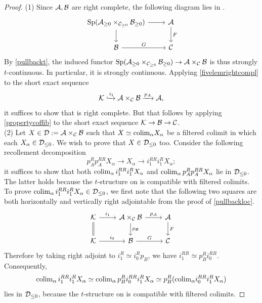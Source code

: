 \documentclass[a4paper,10pt, oneside]{amsart}
\begin{document}
	\begin{proof}
(1) Since $\mathcal{A},\mathcal{B}$ are right complete, the following diagram lies in \prtil.
	$$
\begin{tikzcd}
	\opsp(\mca_{\geq0}\times_{\mcc_{\geq0}}\mcb_{\geq0}) \arrow[d] \arrow[r] & \mca \arrow[d, "F"] \\
	\mcb \arrow[r, "G"]                                               & \mcc               
\end{tikzcd}
$$	
By \cref{pullbackt}, the induced functor $\mathrm{Sp}(\mathcal{A}_{\geq0}\times_{\mathcal{C}_{\geq0}}\mathcal{B}_{\geq0})\to\mathcal{A}\times_{\mathcal{C}}\mathcal{B}$ is thus strongly $t$-continuous. In particular, it is strongly continuous. Applying \cref{fivelemrightcompl} to the short exact sequence $$\mathcal{K}\xhookrightarrow{i_1}\mathcal{A}\times_{\mathcal{C}}\mathcal{B}\xrightarrow{p_A}\mathcal{A},$$  
it suffices to show that \mck is right complete.
 But that follows by applying \cref{propertycoffib} to the short exact sequence $\mathcal{K}\to\mathcal{B}\to\mathcal{C}$.
 \\
(2) Let $X\in \mathcal{D}:=\mathcal{A}\times_{\mathcal{C}}\mathcal{B} $ such that $X\simeq\mathrm{colim}_\alpha X_\alpha$ be a filtered colimit in which each $X_\alpha \in \mathcal{D}_{\leq0}$. We wish to prove that $X\in \mathcal{D}_{\leq0}$ too. Consider the following recollement decomposition
$$p_A^R p_A^{RR} X_\alpha\to X_\alpha\to i_1^{RR}i_1^R X_\alpha;$$
it suffices to show that both $\mathrm{colim}_\alpha\, i_1^{RR}i_1^R X_\alpha$ and $\mathrm{colim}_\alpha \,p_A^R p_A^{RR} X_\alpha$ lie in $\mathcal{D}_{\leq0}$.  The latter holds because the $t$-structure on \mca is compatible with filtered colimits. To prove  $\mathrm{colim}_\alpha\, i_1^{RR}i_1^R X_\alpha \in \mathcal{D}_{\leq0}$, we first note that the following two squares are both horizontally and vertically right adjointable from the proof of \cref{pullbackloc}.	$$
\begin{tikzcd}
	\mck \arrow[r, "i_1"] \arrow[d, Rightarrow, no head] & \mca\times_{\mcc}\mcb \arrow[d, "p_{\mcb}"] \arrow[r, "p_{\mca}"] & \mca \arrow[d, "F"] \\
	\mck \arrow[r, "i_0"]                                & \mcb \arrow[r, "G"]                                               & \mcc               
\end{tikzcd}
$$
Therefore by taking right adjoint to $i_1^R\simeq i_0^R p_B$, we have $i_1^{RR}\simeq p_B^R i_0^{RR}$. Consequently, $$\mathrm{colim}_\alpha\, i_1^{RR}i_1^R X_\alpha\simeq\mathrm{colim}_\alpha\, p_B^Ri_0^{RR}i_1^R X_\alpha \simeq  p_B^R(\mathrm{colim}_\alpha i_0^{RR}i_1^R X_\alpha)$$ lies in $\mathcal{D}_{\leq0}$, because the $t$-structure on \mcb is compatible with filtered colimits.

\end{proof}
\end{document}
